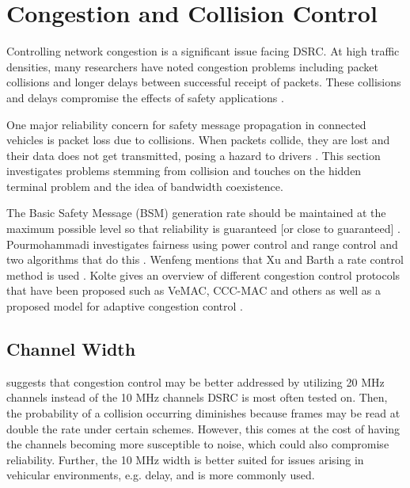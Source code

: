 \documentclass[twoside,conference]{IEEEtran}
\begin{document}
\section{Congestion and Collision Control}\label{sec:congestioncollision}
	Controlling network congestion is a significant issue facing DSRC. At high traffic densities, many researchers have noted congestion problems including packet collisions and longer delays between successful receipt of packets. These collisions and delays compromise the effects of safety applications \cite{Subramanian2012}.
	
	One major reliability concern for safety message propagation in connected vehicles is packet loss due to collisions. When packets collide, they are lost and their data does not get transmitted, posing a hazard to drivers \cite{Hassan2011}. This section investigates problems stemming from collision and touches on the hidden terminal problem and the idea of bandwidth coexistence. 
	
	The Basic Safety Message (BSM) generation rate should be maintained at the maximum possible level so that reliability is guaranteed [or close to guaranteed] \cite{Wenfeng2014}.  Pourmohammadi investigates fairness using power control and range control and two algorithms that do this \cite{Pourmohammadi2015}.  Wenfeng mentions that Xu and Barth a rate control method is used \cite{Wenfeng2014,Xu2004-2}.  Kolte gives an overview of different congestion control protocols that have been proposed such as VeMAC, CCC-MAC and others as well as a proposed model for adaptive congestion control \cite{Kolte2014}. \\

	\subsection{Channel Width}\label{sec:channelwidth}
		\cite{Kenney2011} suggests that congestion control may be better addressed by utilizing 20 MHz channels instead of the 10 MHz channels DSRC is most often tested on. Then, the probability of a collision occurring diminishes because frames may be read at double the rate under certain schemes. However, this comes at the cost of having the channels becoming more susceptible to noise, which could also compromise reliability. Further, the 10 MHz width is better suited for issues arising in vehicular environments, e.g. delay, and is more commonly used.
\end{document}
